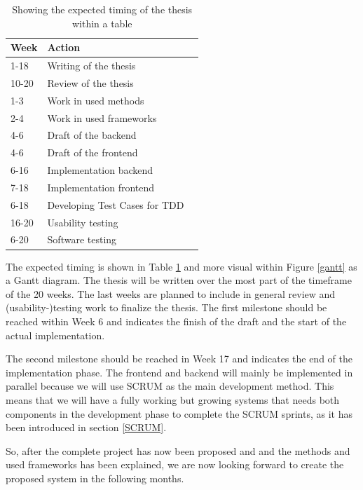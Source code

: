 \documentclass[a4page]{article}
\begin{document}
\begin{table}[h]
\centering%
\begin{tabular}{lll}
Week  		& 	Action				&  \\
\hline 
 1-18		&Writing of the thesis		&  \\
 10-20		& Review of the thesis		&  \\
 1-3			& Work in used methods		&  \\
  2-4 			& Work in used frameworks	&  \\ 				 	
  4-6			& Draft of the backend		&  \\ 
  4-6			& Draft of the frontend		& \\
  6-16		& Implementation backend	&  \\ 
  7-18		& Implementation frontend	&  \\ 
  6-18		& Developing Test Cases for TDD	&  \\ 
 16-20		& Usability testing				&  \\ 
 6-20		& Software testing				&  \\ 
\hline
\end{tabular}
\caption{Showing the expected timing of the thesis within a table}
\label{tgantt}
\end{table}

The expected timing is shown in Table \ref{tgantt} and more visual within Figure \ref{gantt} as a Gantt diagram. The thesis will be written over the most part of the timeframe of the 20 weeks. The last weeks are planned to include in general review and (usability-)testing work to finalize the thesis. The first milestone should be reached within Week 6 and indicates the finish of the draft and the start of the actual implementation. 

The second milestone should be reached in Week 17 and indicates the end of the implementation phase. The frontend and backend will mainly be implemented in parallel because we will use SCRUM as the main development method. This means that we will have a fully working but growing systems that needs both components in the development phase to complete the SCRUM sprints, as it has been introduced in section \ref{SCRUM}. 

So, after the complete project has now been proposed and and the methods and used frameworks has been explained, we are now looking forward to create the proposed system in the following months.

\clearpage
\end{document}
